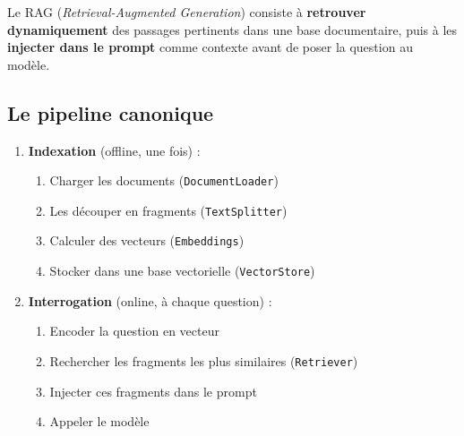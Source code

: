 \documentclass[11pt,a4paper]{article}
\begin{document}
Le RAG (\emph{Retrieval-Augmented Generation}) consiste à \textbf{retrouver dynamiquement} des passages pertinents dans une base documentaire, puis à les \textbf{injecter dans le prompt} comme contexte avant de poser la question au modèle.

\subsection{Le pipeline canonique}

\begin{enumerate}
  \item \textbf{Indexation} (offline, une fois) :
    \begin{enumerate}[label=(\alph*)]
      \item Charger les documents (\texttt{DocumentLoader})
      \item Les découper en fragments (\texttt{TextSplitter})
      \item Calculer des vecteurs (\texttt{Embeddings})
      \item Stocker dans une base vectorielle (\texttt{VectorStore})
    \end{enumerate}
  \item \textbf{Interrogation} (online, à chaque question) :
    \begin{enumerate}[label=(\alph*)]
      \item Encoder la question en vecteur
      \item Rechercher les fragments les plus similaires (\texttt{Retriever})
      \item Injecter ces fragments dans le prompt
      \item Appeler le modèle
    \end{enumerate}
\end{enumerate}
\end{document}
